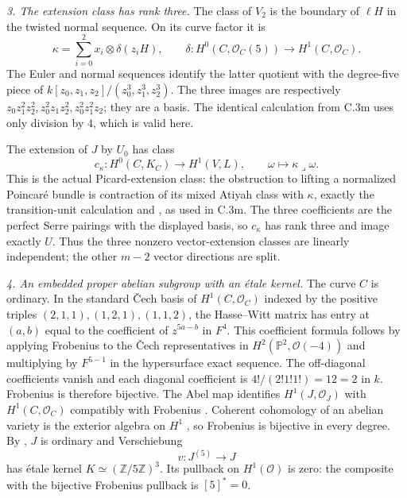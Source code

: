 \emph{3. The extension class has rank three.}
The class of $V_2$ is the boundary of $\ell H$ in the twisted normal
sequence. On its curve factor it is
\[
 \kappa=\sum_{i=0}^2 x_i\otimes\delta(z_iH),\qquad
 \delta:H^0(C,\mathcal O_C(5))\to H^1(C,\mathcal O_C).
\]
The Euler and normal sequences identify the latter quotient with
the degree-five piece of $k[z_0,z_1,z_2]/(z_0^3,z_1^3,z_2^3)$.
The three images are respectively
$z_0z_1^2z_2^2,z_0^2z_1z_2^2,z_0^2z_1^2z_2$; they are a basis.
The identical calculation from C.3m uses only division by $4$,
which is valid here.

The extension of $J$ by $U_0$ has class
\[
 c_\kappa:H^0(C,K_C)\longrightarrow H^1(V,L),
 \qquad \omega\longmapsto\kappa\mathbin{\lrcorner}\omega.
\]
This is the actual Picard-extension class: the obstruction to
lifting a normalized Poincaré bundle is contraction of its mixed
Atiyah class with $\kappa$, exactly the transition-unit calculation
and \citet[Theorem~2.6 and formula~(2.7.2), pp.~166--167]{D_Illusie1972Torsors}, as used in C.3m.
The three coefficients are the perfect Serre pairings with the
displayed basis, so $c_\kappa$ has rank three and image exactly $U$.
Thus the three nonzero vector-extension classes are linearly
independent; the other $m-2$ vector directions are split.

\emph{4. An embedded proper abelian subgroup with an étale kernel.}
The curve $C$ is ordinary. In the standard Čech basis of
$H^1(C,\mathcal O_C)$ indexed by the positive triples
$(2,1,1),(1,2,1),(1,1,2)$, the Hasse--Witt matrix has entry at
$(a,b)$ equal to the coefficient of $z^{5a-b}$ in $F^4$.
This coefficient formula follows by applying Frobenius to the
Čech representatives in $H^2(\mathbb P^2,\mathcal O(-4))$ and
multiplying by $F^{5-1}$ in the hypersurface exact sequence.
The off-diagonal coefficients vanish and each diagonal coefficient
is $4!/(2!1!1!)=12=2$ in $k$. Frobenius is therefore bijective. The Abel map identifies
$H^1(J,\mathcal O_J)$ with $H^1(C,\mathcal O_C)$ compatibly with
Frobenius \citep[Lemma9.5]{D_MilneJacobians2021}. Coherent cohomology
of an abelian variety is the exterior algebra on $H^1$
\citep[Theorem1.1, p.~1]{D_BrionCoherent2012}, so Frobenius is
bijective in every degree. By
\citet[Lemma2.3.1 and Proposition2.3.2, p.~12]{D_HaconPatakfalvi2014v2},
$J$ is ordinary and Verschiebung
\[
 v:J^{(5)}\longrightarrow J
\]
has étale kernel $K\simeq(\mathbb Z/5\mathbb Z)^3$.
Its pullback on $H^1(\mathcal O)$ is zero: the composite with the
bijective Frobenius pullback is $[5]^*=0$.

